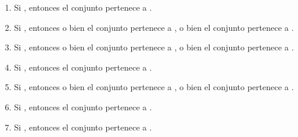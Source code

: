 \begin{isabellebody}
\begin{isamarkuptext}
\begin{definicion}
\begin{enumerate}
      \item Si , entonces el conjunto  pertenece a .
      \item Si , entonces o bien el conjunto  pertenece a , o bien el 
        conjunto  pertenece a .
      \item Si , entonces o bien el conjunto  pertenece a , o bien el 
        conjunto  pertenece a .
      \item Si , entonces el conjunto  pertenece a .
      \item Si , entonces o bien el conjunto  pertenece a , o bien el 
        conjunto  pertenece a .
      \item Si , entonces el conjunto  pertenece a .
      \item Si , entonces el conjunto  pertenece a .
    \end{enumerate}
  \end{definicion}


\end{isamarkuptext}
\end{isabellebody}
